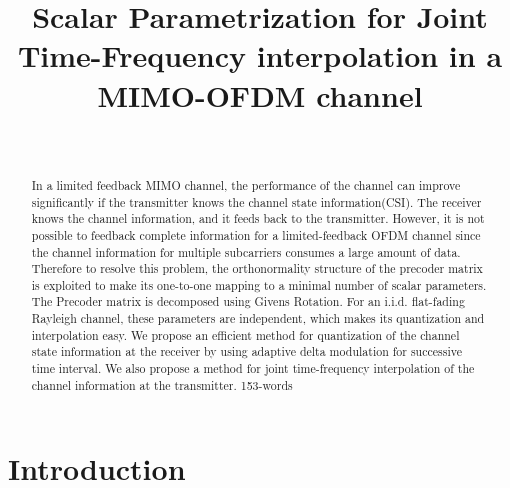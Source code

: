 \documentclass[conference]{IEEEtran}
\begin{document}

\title{Scalar Parametrization for Joint Time-Frequency interpolation in a MIMO-OFDM channel}



 \author{
 \
}
\maketitle

\thispagestyle{plain}



\begin{abstract}
In a limited feedback MIMO channel, the performance of the channel can improve significantly if the transmitter knows the channel state information(CSI). The receiver knows the channel information, and it feeds back to the transmitter. However, it is not possible to feedback complete information for a limited-feedback OFDM channel since the channel information for multiple subcarriers consumes a large amount of data. Therefore to resolve this problem, the orthonormality structure of the precoder matrix is exploited to make its one-to-one mapping to a minimal number of scalar parameters. The Precoder matrix is decomposed using Givens Rotation. For an i.i.d. flat-fading Rayleigh channel, these parameters are independent, which makes its quantization and interpolation easy. We propose an efficient method for quantization of the channel state information at the receiver by using adaptive delta modulation for successive time interval. We also propose a method for joint time-frequency interpolation of the channel information at the transmitter. 153-words
\end{abstract}

\section{Introduction}
\label{intro}
\end{document}
